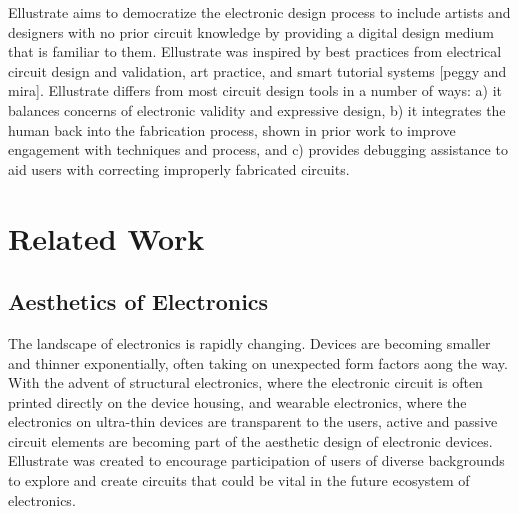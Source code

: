\documentclass{sigchi}
\begin{document}
Ellustrate aims to democratize the electronic design process to include artists and designers with no prior circuit knowledge by providing a digital design medium that is familiar to them.
Ellustrate was inspired by best practices from electrical circuit design and validation, art practice, and smart tutorial systems [peggy and mira]. Ellustrate differs from most circuit design tools in a number of ways: a) it balances concerns of electronic validity and expressive design, b) it integrates the human back into the fabrication process, shown in prior work to improve engagement with techniques and process, and c) provides debugging assistance to aid users with correcting improperly fabricated circuits.


\section{Related Work}
\subsection{Aesthetics of Electronics}
The landscape of electronics is rapidly changing. Devices are becoming smaller and thinner exponentially, often taking on unexpected form factors aong the way. With the advent of structural electronics, where the electronic circuit is often printed directly on the device housing, and wearable electronics, where the electronics on ultra-thin devices are transparent to the users, active and passive circuit elements are becoming part of the aesthetic design of electronic devices. Ellustrate was created to encourage participation of users of diverse backgrounds to explore and create circuits that could be vital in the future ecosystem of electronics. 
\end{document}
